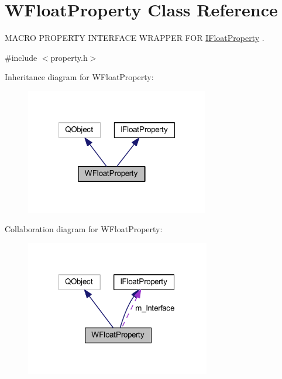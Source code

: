 \hypertarget{class_w_float_property}{\section{W\-Float\-Property Class Reference}
\label{class_w_float_property}
}


M\-A\-C\-R\-O P\-R\-O\-P\-E\-R\-T\-Y I\-N\-T\-E\-R\-F\-A\-C\-E W\-R\-A\-P\-P\-E\-R F\-O\-R \hyperlink{class_i_float_property}{I\-Float\-Property} .  




{\ttfamily \#include $<$property.\-h$>$}



Inheritance diagram for W\-Float\-Property\-:
\nopagebreak
\begin{figure}[H]
\begin{center}
\leavevmode
\includegraphics[width=227pt]{class_w_float_property__inherit__graph}
\end{center}
\end{figure}


Collaboration diagram for W\-Float\-Property\-:
\nopagebreak
\begin{figure}[H]
\begin{center}
\leavevmode
\includegraphics[width=229pt]{class_w_float_property__coll__graph}
\end{center}
\end{figure}
